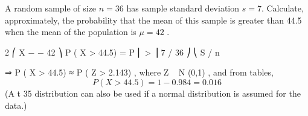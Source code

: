 \documentclass[a4paper,12pt]{article}
\begin{document}
\large 
\noindent A random sample of size $n = 36$ has sample standard deviation $s = 7$.
Calculate, approximately, the probability that the mean of this sample is greater than
44.5 when the mean of the population is $\mu = 42$ .


2
⎛ X −  − 42 ⎞
P ( X > 44.5) = P ⎜
>
⎟
7 / 36 ⎠
⎝ S / n

⇒ P ( X > 44.5) ≈ P ( Z > 2.143) , where Z ~ N (0,1) ,
and from tables,
\[P ( X > 44.5) = 1 − 0.984 = 0.016\]
(A t 35 distribution can also be used if a normal distribution is assumed for the data.)
\end{document}
